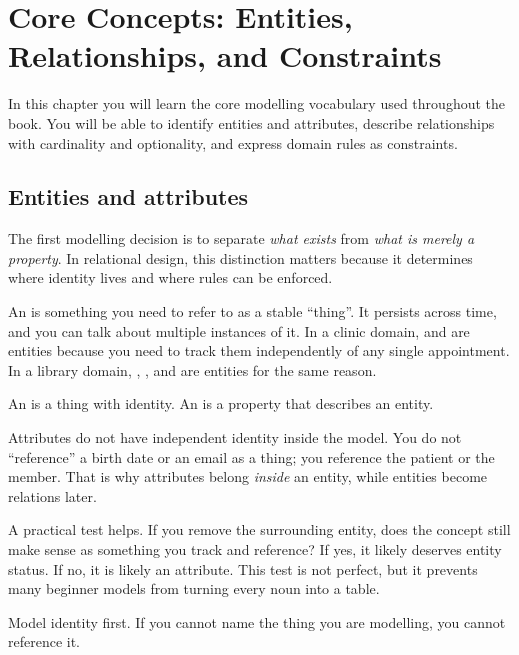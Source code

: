 \chapter{Core Concepts: Entities, Relationships, and Constraints}

\begin{learningobjectives}
In this chapter you will learn the core modelling vocabulary used throughout the book.
You will be able to identify entities and attributes, describe relationships with cardinality and optionality, and express domain rules as constraints.
\end{learningobjectives}

\section{Entities and attributes}
The first modelling decision is to separate \emph{what exists} from \emph{what is merely a property}.
In relational design, this distinction matters because it determines where identity lives and where rules can be enforced.

An  is something you need to refer to as a stable “thing”.
It persists across time, and you can talk about multiple instances of it.
In a clinic domain,  and  are entities because you need to track them independently of any single appointment.
In a library domain, , , and  are entities for the same reason.

\begin{definitionbox}
An  is a thing with identity.
An  is a property that describes an entity.
\end{definitionbox}

Attributes do not have independent identity inside the model.
You do not “reference” a birth date or an email as a thing; you reference the patient or the member.
That is why attributes belong \emph{inside} an entity, while entities become relations later.

A practical test helps.
If you remove the surrounding entity, does the concept still make sense as something you track and reference?
If yes, it likely deserves entity status.
If no, it is likely an attribute.
This test is not perfect, but it prevents many beginner models from turning every noun into a table.

\begin{principlebox}
Model identity first.
If you cannot name the thing you are modelling, you cannot reference it.
\end{principlebox}

